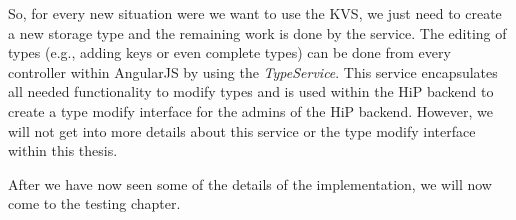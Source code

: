 So, for every new situation were we want to use the \ac{KVS}, we just need to create a new storage type and the remaining work is done by the service. The editing of types (e.g., adding keys or even complete types) can be done from every controller within AngularJS by using the \emph{TypeService}. This service encapsulates all needed functionality to modify types and is used within the \ac{HiP} backend to create a type modify interface for the admins of the \ac{HiP} backend. However, we will not get into more details about this service or the type modify interface within this thesis.






After we have now seen some of the details of the implementation, we will now come to the testing chapter. 